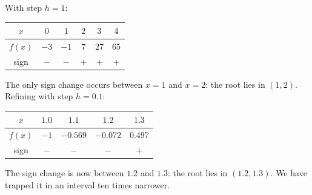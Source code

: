 \documentclass[11pt]{article}
\begin{document}
\begin{exemplebox}[Tabulating $f(x) = x^3 + x - 3$]
With step $h = 1$:
\begin{center}
\begin{tabular}{|c|ccccc|}
\hline
\rowcolor{popblueL} $x$ & $0$ & $1$ & $2$ & $3$ & $4$ \\
\hline
$f(x)$ & $-3$ & $-1$ & $7$ & $27$ & $65$ \\
\hline
sign & $-$ & $-$ & $+$ & $+$ & $+$ \\
\hline
\end{tabular}
\end{center}
The only sign change occurs between $x = 1$ and $x = 2$: the root lies in $(1, 2)$. Refining with step $h = 0.1$:
\begin{center}
\begin{tabular}{|c|cccc|}
\hline
\rowcolor{popblueL} $x$ & $1.0$ & $1.1$ & $1.2$ & $1.3$ \\
\hline
$f(x)$ & $-1$ & $-0.569$ & $-0.072$ & $0.497$ \\
\hline
sign & $-$ & $-$ & $-$ & $+$ \\
\hline
\end{tabular}
\end{center}
The sign change is now between $1.2$ and $1.3$: the root lies in $(1.2, 1.3)$. We have trapped it in an interval ten times narrower.
\end{exemplebox}
\end{document}
